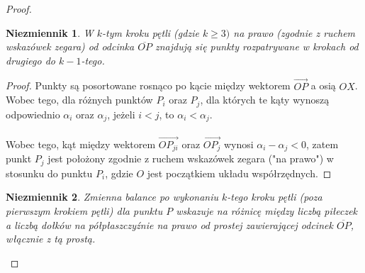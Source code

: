\documentclass[10pt,a4paper]{article}
\newtheorem{invariant}{Niezmiennik}
\begin{document}
\begin{proof}
		\begin{invariant} \label{invariant:3}
			W $k$-tym kroku pętli (gdzie $k \geq 3)$ na prawo (zgodnie z ruchem wskazówek zegara) od odcinka $\overline{OP}$ znajdują się punkty rozpatrywane w krokach od drugiego do $k-1$-tego.
		\end{invariant}

		\begin{proof}
			Punkty są posortowane rosnąco po kącie między wektorem $\overrightarrow{OP}$ a osią $OX$.  Wobec tego, dla różnych punktów $P_{i}$ oraz $P_{j}$, dla których te kąty wynoszą odpowiednio $\alpha_{i}$ oraz $\alpha_{j}$, jeżeli $i < j$, to $\alpha_{i} < \alpha_{j}$. \\~\\
			Wobec tego, kąt między wektorem $\overrightarrow{OP_{ji}}$ oraz $\overrightarrow{OP_{j}}$ wynosi $\alpha_{i} - \alpha_{j} < 0$, zatem punkt $P_{j}$ jest położony zgodnie z ruchem wskazówek zegara ("na prawo") w stosunku do punktu $P_{i}$, gdzie $O$ jest początkiem układu współrzędnych.
		\end{proof}

		\begin{invariant} \label{invariant:4}
			Zmienna balance po wykonaniu $k$-tego kroku pętli (poza pierwszym krokiem pętli) dla punktu $P$ wskazuje na różnicę między liczbą piłeczek a liczbą dołków na półpłaszczyźnie na prawo od prostej zawierającej odcinek $\overline{OP}$, włącznie z tą prostą.
		\end{invariant}


\end{proof}
\end{document}
